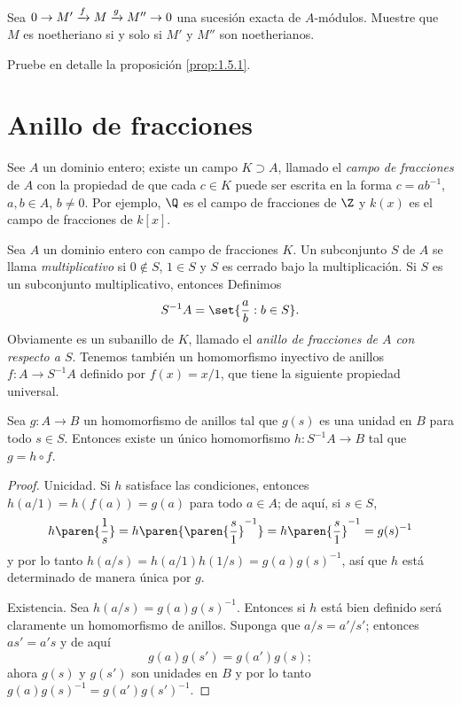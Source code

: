 \ExerciseSection

\begin{ExerciseList}
  \item Sea $0 \to M' \xrightarrow{f} M \xrightarrow{g} M'' \to 0$ una sucesión exacta de $A$-módulos. Muestre que $M$ es noetheriano si y solo si $M'$ y $M''$ son noetherianos.
  \item Pruebe en detalle la proposición \ref{prop:1.5.1}.
\end{ExerciseList}




\section{Anillo de fracciones}

See $A$ un dominio entero; existe un campo $K \supset A$, llamado el \emph{campo de fracciones} de $A$ con la propiedad de que cada $c \in K$ puede ser escrita en la forma $c = ab^{-1}$, $a, b \in A$, $b \neq 0$. Por ejemplo, $\Q$ es el campo de fracciones de $\Z$ y $k(x)$ es el campo de fracciones de $k[x]$.

Sea $A$ un dominio entero con campo de fracciones $K$. Un subconjunto $S$ de $A$ se llama \emph{multiplicativo} si $0 \notin S$, $1 \in S$ y $S$ es cerrado bajo la multiplicación. Si $S$ es un subconjunto multiplicativo, entonces Definimos
\[
  S^{-1}A = \set{\frac{a}{b} : b \in S}.
\]
Obviamente es un subanillo de $K$, llamado el \emph{anillo de fracciones de $A$ con respecto a $S$}. Tenemos también un homomorfismo inyectivo de anillos $f\colon A \to S^{-1}A$ definido por $f(x) = x/1$, que tiene la siguiente propiedad universal.

\begin{proposition}
  Sea $g\colon A \to B$ un homomorfismo de anillos tal que $g(s)$ es una unidad en $B$ para todo $s \in S$. Entonces existe un único homomorfismo $h\colon S^{-1}A \to B$ tal que $g = h \circ f$.
\end{proposition}
\begin{proof}
  Unicidad. Si $h$ satisface las condiciones, entonces $h(a/1) = h(f(a)) = g(a)$ para todo $a \in A$; de aquí, si $s \in S$, 
  \[
    h\paren{\frac{1}{s}} = h\paren{\paren{\frac{s}{1}}^{-1}} =  h\paren{\frac{s}{1}}^{-1} = g(s)^{-1}
  \]
  y por lo tanto $h(a/s) = h(a/1) h(1/s) = g(a)g(s)^{-1}$, así que $h$ está determinado de manera única por $g$.

  Existencia. Sea $h(a/s) = g(a)g(s)^{-1}$. Entonces si $h$ está bien definido será claramente un homomorfismo de anillos. Suponga que $a/s = a'/s'$; entonces $as' = a's$ y de aquí
  \[
    g(a)g(s') = g(a')g(s);
  \]
  ahora $g(s)$ y $g(s')$ son unidades en $B$ y por lo tanto $g(a)g(s)^{-1} = g(a')g(s')^{-1}$.
\end{proof}

